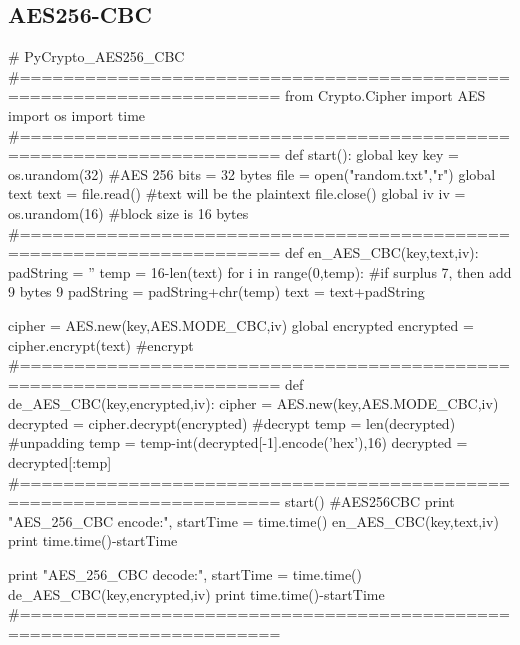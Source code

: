\documentclass{article}
\begin{document}
\subsection{AES256-CBC}
\begin{python}
# PyCrypto_AES256_CBC
#======================================================================
from Crypto.Cipher import AES
import os
import time
#======================================================================
def start():
    global key
    key = os.urandom(32)                    #AES 256 bits = 32 bytes
    file = open("random.txt","r")
    global text 
    text = file.read()                      #text will be the plaintext
    file.close()
    global iv
    iv = os.urandom(16)                     #block size is 16 bytes
#======================================================================
def en_AES_CBC(key,text,iv):
    padString = ''
    temp = 16-len(text)%
    for i in range(0,temp):           #if surplus 7, then add 9 bytes 9
        padString = padString+chr(temp)
    text = text+padString

    cipher = AES.new(key,AES.MODE_CBC,iv)
    global encrypted 
    encrypted = cipher.encrypt(text)                           #encrypt
#======================================================================
def de_AES_CBC(key,encrypted,iv):
    cipher = AES.new(key,AES.MODE_CBC,iv)
    decrypted = cipher.decrypt(encrypted)                      #decrypt
    temp = len(decrypted)                                    #unpadding
    temp = temp-int(decrypted[-1].encode('hex'),16)
    decrypted = decrypted[:temp]
#======================================================================
start()
#AES256CBC
print "AES_256_CBC encode:",
startTime = time.time()
en_AES_CBC(key,text,iv)
print time.time()-startTime

print "AES_256_CBC decode:",
startTime = time.time()
de_AES_CBC(key,encrypted,iv)
print time.time()-startTime
#======================================================================
\end{python}
\newpage
\end{document}
